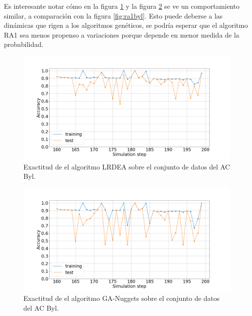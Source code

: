 Es interesante notar cómo en la figura \ref{fig:lrdeabyl} y la figura \ref{fig:ganuggetsabyl} se ve un comportamiento similar, a comparación con la figura \ref{fig:ra1byl}. Esto puede deberse a las dinámicas que rigen a los algoritmos genéticos, se podría esperar que el algoritmo RA1 sea menos propenso a variaciones porque depende en menor medida de la probabilidad.
\begin{figure}[H]
	\centering
	\includegraphics[width=\linewidth]{fig/LRDEA_4}
	\caption{Exactitud de el algoritmo LRDEA sobre el conjunto de datos del AC Byl.}
	\label{fig:lrdeabyl}
\end{figure}

\begin{figure}[H]
	\centering
	\includegraphics[width=\linewidth]{fig/GA-nuggets_5}
	\caption{Exactitud de el algoritmo GA-Nuggets sobre el conjunto de datos del AC Byl.}
	\label{fig:ganuggetsabyl}
\end{figure}


